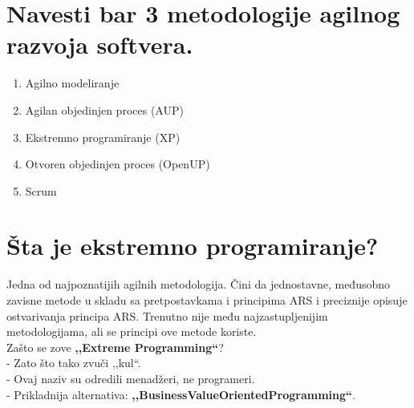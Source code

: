 \documentclass[a4paper]{article}
\begin{document}
\section{Navesti bar 3 metodologije agilnog razvoja softvera.}
  \begin{enumerate}
    \item Agilno modeliranje
    \item Agilan objedinjen proces (AUP)
    \item Ekstremno programiranje (XP)
    \item Otvoren objedinjen proces (OpenUP)
    \item Scrum
  \end{enumerate}

\section{Šta je ekstremno programiranje?}
  Jedna od najpoznatijih agilnih metodologija. Čini da jednostavne, međusobno zavisne metode u skladu
  sa pretpostavkama i principima ARS i preciznije opisuje ostvarivanja principa ARS. Trenutno nije
  među najzastupljenijim metodologijama, ali se principi ove metode koriste.\\

  Zašto se zove \textbf{,,Extreme Programming``}? \\
    \indent - Zato što tako zvuči ,,kul``. \\
    \indent - Ovaj naziv su odredili menadžeri, ne programeri.\\
    \indent - Prikladnija alternativa: \textbf{,,BusinessValueOrientedProgramming``}. \cite{wikic2_xp}
\end{document}
